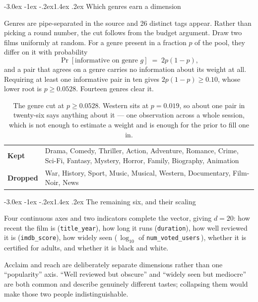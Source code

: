 \documentclass[11pt,a4paper]{article}
\makeatletter
\renewcommand\subsection{\@startsection{subsection}{2}{\z@}%
  {-3.0ex \@plus -1ex \@minus -.2ex}{1.4ex \@plus .2ex}%
  {\normalfont\large\sffamily\bfseries\color{accent}}}
\newcommand{\file}[1]{\texttt{\small #1}}
\makeatother
\begin{document}
\subsection{Which genres earn a dimension}

Genres are pipe-separated in the source and 26 distinct tags appear. Rather than
picking a round number, the cut follows from the budget argument. Draw two films
uniformly at random. For a genre present in a fraction $p$ of the pool, they
differ on it with probability
\[
  \Pr[\text{informative on genre } g] \;=\; 2p(1-p),
\]
and a pair that agrees on a genre carries no information about its weight at all.
Requiring at least one informative pair in ten gives $2p(1-p) \geq 0.10$, whose
lower root is $p \geq 0.0528$. Fourteen genres clear it.

\begin{table}[H]
\centering\small
\begin{tabularx}{\textwidth}{lX}
\toprule
\textbf{Kept} & Drama, Comedy, Thriller, Action, Adventure, Romance, Crime,
                Sci-Fi, Fantasy, Mystery, Horror, Family, Biography, Animation \\
\textbf{Dropped} & War, History, Sport, Music, Musical, Western, Documentary,
                Film-Noir, News \\
\bottomrule
\end{tabularx}
\caption{The genre cut at $p \geq 0.0528$. Western sits at $p = 0.019$, so about
one pair in twenty-six says anything about it --- one observation across a whole
session, which is not enough to estimate a weight and is enough for the prior to
fill one in.}
\end{table}

\subsection{The remaining six, and their scaling}

Four continuous axes and two indicators complete the vector, giving $d = 20$:
how recent the film is (\file{title\_year}), how long it runs
(\file{duration}), how well reviewed it is (\file{imdb\_score}), how widely seen
(\,$\log_{10}$ of \file{num\_voted\_users}\,), whether it is certified for adults,
and whether it is black and white.

Acclaim and reach are deliberately separate dimensions rather than one
``popularity'' axis. ``Well reviewed but obscure'' and ``widely seen but
mediocre'' are both common and describe genuinely different tastes; collapsing
them would make those two people indistinguishable.
\end{document}
